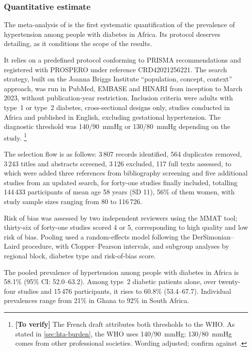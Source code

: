 \documentclass[12pt,a4paper,oneside]{report}
\newcommand{\verify}[1]{\footnote{\textbf{[To verify]} #1}}
\begin{document}
\subsubsection{Quantitative estimate}

The meta-analysis of \textcite{hinneh2023} is the first systematic quantification of the prevalence of hypertension among people with diabetes in Africa. Its protocol deserves detailing, as it conditions the scope of the results.

It relies on a predefined protocol conforming to PRISMA recommendations and registered with PROSPERO under reference CRD42021256221. The search strategy, built on the Joanna Briggs Institute ``population, concept, context'' approach, was run in PubMed, EMBASE and HINARI from inception to March 2023, without publication-year restriction. Inclusion criteria were adults with type~1 or type~2 diabetes, cross-sectional designs only, studies conducted in Africa and published in English, excluding gestational hypertension. The diagnostic threshold was 140/90~mmHg or 130/80~mmHg depending on the study.%
\verify{The French draft attributes both thresholds to the WHO. As stated in \cref{sec:hta-burden}, the WHO uses 140/90~mmHg; 130/80~mmHg comes from other professional societies. Wording adjusted; confirm against \textcite{hinneh2023}.}

The selection flow is as follows: 3\,807 records identified, 564 duplicates removed, 3\,243 titles and abstracts screened, 3\,126 excluded, 117 full texts assessed, to which were added three references from bibliography screening and five additional studies from an updated search, for forty-one studies finally included, totalling 144\,433 participants of mean age 58 years (SD 11), 56\% of them women, with study sample sizes ranging from 80 to 116\,726.

Risk of bias was assessed by two independent reviewers using the MMAT tool; thirty-six of forty-one studies scored 4 or 5, corresponding to high quality and low risk of bias. Pooling used a random-effects model following the DerSimonian--Laird procedure, with Clopper--Pearson intervals, and subgroup analyses by regional block, diabetes type and risk-of-bias score.

The pooled prevalence of hypertension among people with diabetes in Africa is 58.1\% (95\% CI: 52.0--63.2). Among type~2 diabetic patients alone, over twenty-four studies and 15\,476 participants, it rises to 60.8\% (53.4--67.7). Individual prevalences range from 21\% in Ghana to 92\% in South Africa.
\end{document}
